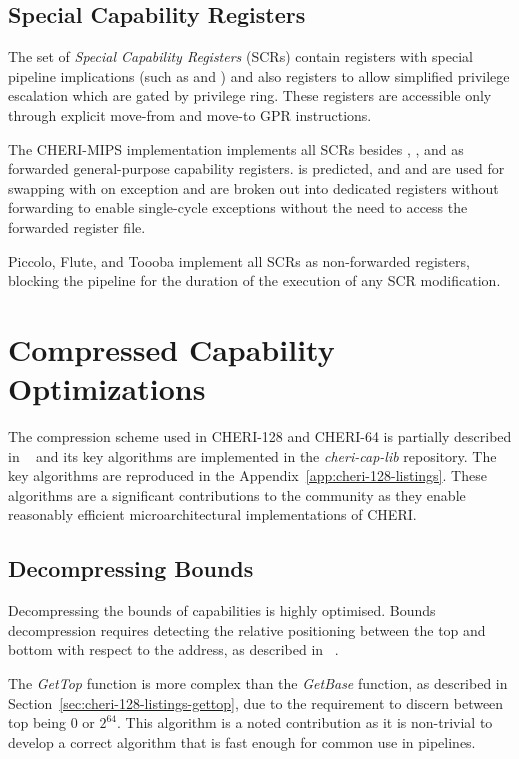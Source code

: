 \subsection{Special Capability Registers}
The set of \emph{Special Capability Registers} (SCRs) contain registers with special pipeline implications (such as \DDC{} and \PCC{}) and also registers to allow simplified privilege escalation which are gated by privilege ring.
These registers are accessible only through explicit move-from and move-to GPR instructions.

The CHERI-MIPS implementation implements all SCRs besides \PCC{}, \KCC{}, and \EPCC{} as forwarded general-purpose capability registers.
\PCC{} is predicted, and \KCC{} and \EPCC{} are used for swapping with \PCC{} on exception and are broken out into dedicated registers without forwarding to enable single-cycle exceptions without the need to access the forwarded register file.

Piccolo, Flute, and Toooba implement all SCRs as non-forwarded registers, blocking the pipeline for the duration of the execution of any SCR modification.

\section{Compressed Capability Optimizations}
\label{comp-cap}

The compression scheme used in CHERI-128 and CHERI-64 is partially described in ~\cite{Woodruff2019} and its key algorithms are implemented in the \emph{cheri-cap-lib} repository.
The key algorithms are reproduced in the Appendix~\ref{app:cheri-128-listings}.
These algorithms are a significant contributions to the community as they enable reasonably efficient microarchitectural implementations of CHERI.

\subsection{Decompressing Bounds}
Decompressing the bounds of capabilities is highly optimised.
Bounds decompression requires detecting the relative positioning between the top and bottom with respect to the address, as described in ~\cite{Woodruff2019}.

The \emph{GetTop} function is more complex than the \emph{GetBase} function, as described in Section~\ref{sec:cheri-128-listings-gettop}, due to the requirement to discern between top being $0$ or $2^{64}$.
This algorithm is a noted contribution as it is non-trivial to develop a correct algorithm that is fast enough for common use in pipelines.

